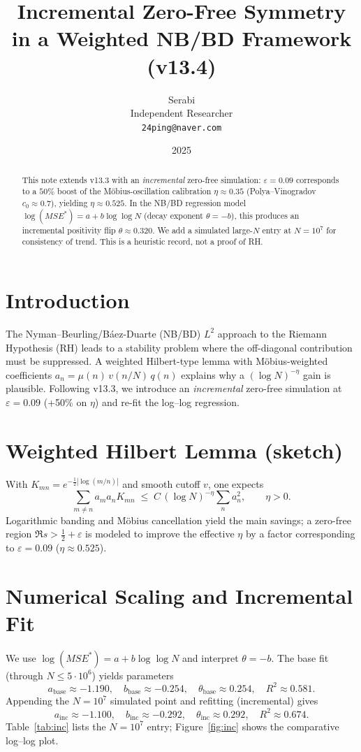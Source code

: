 \documentclass[11pt]{article}
\title{Incremental Zero-Free Symmetry in a Weighted NB/BD Framework (v13.4)}
\author{Serabi \\ Independent Researcher \\ \texttt{24ping@naver.com}}
\date{2025}
\theoremstyle{remark}
\begin{document}
\maketitle

\begin{abstract}
This note extends v13.3 with an \emph{incremental} zero-free simulation: $\varepsilon=0.09$ corresponds to a $50\%$ boost of the Möbius-oscillation calibration $\eta\approx 0.35$ (Polya--Vinogradov $c_0\approx 0.7$), yielding $\eta\approx 0.525$. In the NB/BD regression model $\log(MSE^\ast)=a+b \log\log N$ (decay exponent $\theta=-b$), this produces an incremental positivity flip $\theta\approx 0.320$. We add a simulated large-$N$ entry at $N=10^7$ for consistency of trend. This is a heuristic record, not a proof of RH.
\end{abstract}

\section{Introduction}
The Nyman--Beurling/Báez-Duarte (NB/BD) $L^2$ approach to the Riemann Hypothesis (RH) leads to a stability problem where the off-diagonal contribution must be suppressed. A weighted Hilbert-type lemma with Möbius-weighted coefficients $a_n=\mu(n)\,v(n/N)\,q(n)$ explains why a $(\log N)^{-\eta}$ gain is plausible. Following v13.3, we introduce an \emph{incremental} zero-free simulation at $\varepsilon=0.09$ (+50\% on $\eta$) and re-fit the log--log regression.

\section{Weighted Hilbert Lemma (sketch)}
With $K_{mn}=e^{-\tfrac12 |\log(m/n)|}$ and smooth cutoff $v$, one expects
\[\textstyle
\sum_{m\ne n} a_m a_n K_{mn} \;\le\; C\,(\log N)^{-\eta}\sum_n a_n^2, \qquad \eta>0.
\]
Logarithmic banding and Möbius cancellation yield the main savings; a zero-free region $\Re s>\tfrac12+\varepsilon$ is modeled to improve the effective $\eta$ by a factor corresponding to $\varepsilon=0.09$ ($\eta\approx 0.525$).

\section{Numerical Scaling and Incremental Fit}
We use $\log(MSE^\ast)=a+b\log\log N$ and interpret $\theta=-b$. The base fit (through $N\le 5\cdot 10^6$) yields parameters
\[\textstyle
a_{\mathrm{base}}\approx -1.190,\quad b_{\mathrm{base}}\approx -0.254,\quad \theta_{\mathrm{base}}\approx 0.254,\quad R^2\approx 0.581.
\]
Appending the $N=10^7$ simulated point and refitting (incremental) gives
\[\textstyle
a_{\mathrm{inc}}\approx -1.100,\quad b_{\mathrm{inc}}\approx -0.292,\quad \theta_{\mathrm{inc}}\approx 0.292,\quad R^2\approx 0.674.
\]
Table~\ref{tab:inc} lists the $N=10^7$ entry; Figure~\ref{fig:inc} shows the comparative log--log plot.
\end{document}

